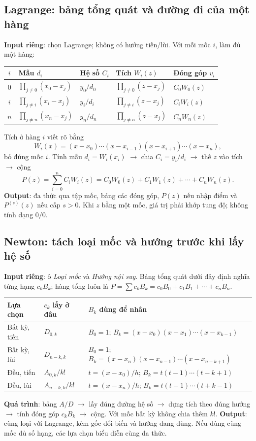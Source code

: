 \subsection{Lagrange: bảng tổng quát và đường đi của một hàng}
\textbf{Input riêng}: chọn Lagrange; không có hướng tiến/lùi. Với mỗi mốc $i$, làm đủ một hàng:
\begin{center}\small\begin{tabular}{cllll}\toprule
$i$&Mẫu $d_i$&Hệ số $C_i$&Tích $W_i(z)$&Đóng góp $v_i$\\\midrule
0&$\prod_{j\ne0}(x_0-x_j)$&$y_0/d_0$&$\prod_{j\ne0}(z-x_j)$&$C_0W_0(z)$\\
$i$&$\prod_{j\ne i}(x_i-x_j)$&$y_i/d_i$&$\prod_{j\ne i}(z-x_j)$&$C_iW_i(z)$\\
$n$&$\prod_{j\ne n}(x_n-x_j)$&$y_n/d_n$&$\prod_{j\ne n}(z-x_j)$&$C_nW_n(z)$\\\bottomrule
\end{tabular}\end{center}
Tích ở hàng $i$ viết rõ bằng
\[
W_i(x)=(x-x_0)\cdots(x-x_{i-1})(x-x_{i+1})\cdots(x-x_n),
\]
bỏ đúng mốc $i$. Tính mẫu $d_i=W_i(x_i)$ $\to$ chia $C_i=y_i/d_i$ $\to$ thế $z$ vào tích $\to$ cộng
\[
P(z)=\sum_{i=0}^nC_iW_i(z)=C_0W_0(z)+C_1W_1(z)+\cdots+C_nW_n(z).
\]
\textbf{Output}: đa thức qua tập mốc, bảng các đóng góp, $P(z)$ nếu nhập điểm và $P^{(s)}(z)$ nếu cấp $s>0$. Khi $z$ bằng một mốc, giá trị phải khớp tung độ; không tính dạng $0/0$.

\subsection{Newton: tách loại mốc và hướng trước khi lấy hệ số}
\textbf{Input riêng}: ô \emph{Loại mốc} và \emph{Hướng nội suy}. Bảng tổng quát dưới đây định nghĩa từng hạng $c_kB_k$; hàng tổng luôn là $P=\sum c_kB_k=c_0B_0+c_1B_1+\cdots+c_nB_n$.
\begin{center}\small\begin{tabular}{@{}p{.20\linewidth}p{.21\linewidth}p{.49\linewidth}@{}}\toprule
Lựa chọn&$c_k$ lấy ở đâu&$B_k$ dùng để nhân\\\midrule
Bất kỳ, tiến&$D_{0,k}$&$B_0=1$; $B_k=(x-x_0)(x-x_1)\cdots(x-x_{k-1})$\\
Bất kỳ, lùi&$D_{n-k,k}$&$B_0=1$; $B_k=(x-x_n)(x-x_{n-1})\cdots(x-x_{n-k+1})$\\
Đều, tiến&$A_{0,k}/k!$&$t=(x-x_0)/h$; $B_k=t(t-1)\cdots(t-k+1)$\\
Đều, lùi&$A_{n-k,k}/k!$&$t=(x-x_n)/h$; $B_k=t(t+1)\cdots(t+k-1)$\\\bottomrule
\end{tabular}\end{center}
\textbf{Quá trình}: bảng $A/D$ $\to$ lấy đúng đường hệ số $\to$ dựng tích theo đúng hướng $\to$ tính đóng góp $c_kB_k$ $\to$ cộng. Với mốc bất kỳ không chia thêm $k!$. \textbf{Output}: cùng loại với Lagrange, kèm gốc đổi biến và hướng đang dùng. Nếu dùng cùng mốc đủ số hạng, các lựa chọn biểu diễn cùng đa thức.

